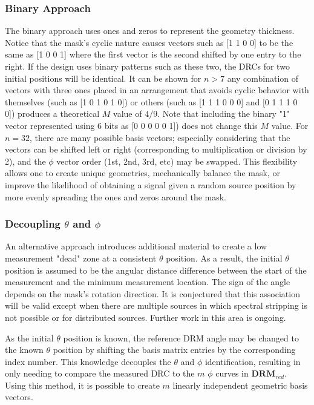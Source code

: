 \documentclass[3p,times]{elsarticle}
\begin{document}
\subsubsection{Binary Approach}
The binary approach uses ones and zeros to represent the geometry thickness.  
Notice that the mask's cyclic nature causes vectors such as [1 1 0 0] to be the same as [1 0 0 1] where the first vector is the second shifted by one entry to the right.  
If the design uses binary patterns such as these two, the DRCs for two initial positions will be identical.  
It can be shown for $n>7$ any combination of vectors with three ones placed in an arrangement that avoids cyclic behavior with themselves (such as [1 0 1 0 1 0]) or others (such as [1 1 1 0 0 0] and [0 1 1 1 0 0]) produces a theoretical $M$ value of $4/9$.  
Note that including the binary "1" vector represented using 6 bits as [0 0 0 0 0 1]) does not change this $M$ value.   
For $n=32$, there are many possible basis vectors; especially considering that the vectors can be shifted left or right (corresponding to multiplication or division by 2), and the $\phi$ vector order (1st, 2nd, 3rd, etc) may be swapped.  
This flexibility allows one to create unique geometries, mechanically balance the mask, or improve the likelihood of obtaining a signal given a random source position by more evenly spreading the ones and zeros around the mask.

\subsubsection{Decoupling $\theta$ and $\phi$}
\label{sec:decoupling}
An alternative approach introduces additional material to create a low measurement "dead" zone at a consistent $\theta$ position.  
As a result, the initial $\theta$ position is assumed to be the angular distance difference between the start of the measurement and the minimum measurement location.  
The sign of the angle depends on the mask's rotation direction.  
It is conjectured that this association will be valid except when there are multiple sources in which spectral stripping is not possible  or for distributed sources.  
Further work in this area is ongoing.

As the initial $\theta$ position is known, the reference DRM angle may be changed to the known $\theta$ position by shifting the basis matrix entries by the corresponding index number.
This knowledge decouples the $\theta$ and $\phi$ identification, resulting in only  needing to compare the measured DRC to the $m$ $\phi$ curves in $\mathbf{DRM}_{red}$.  
Using this method, it is possible to create $m$ linearly independent geometric basis vectors.
\end{document}
